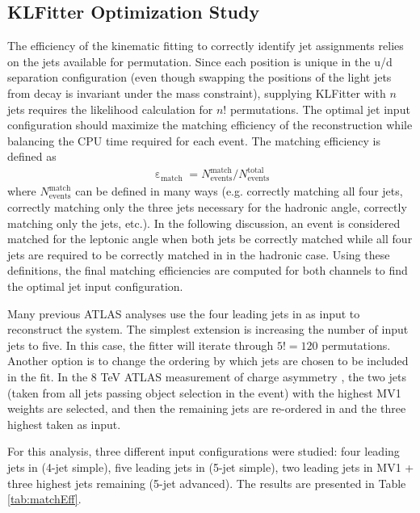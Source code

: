\subsection{KLFitter Optimization Study}
\label{sec:KLopt}
The efficiency of the kinematic fitting to correctly identify jet assignments relies on the jets available for permutation. Since each position is unique in the u/d separation configuration (even though swapping the positions of the light jets from \w decay is invariant under the \w mass constraint), supplying KLFitter with $n$ jets requires the likelihood calculation for $n!$ permutations. The optimal jet input configuration should maximize the matching efficiency of the reconstruction while balancing the CPU time required for each event. %
The matching efficiency is defined as
\begin{eqnarray}
\upepsilon_{\text{match}}=N_{\text{events}}^{\text{match}}/N_{\text{events}}^{\text{total}}
\label{eq:matchEff}
\end{eqnarray}
where $N_{\text{events}}^{\text{match}}$ can be defined in many ways (e.g. correctly matching all four jets, correctly matching only the three jets necessary for the hadronic angle, correctly matching only the \bt jets, etc.). In the following discussion, an event is considered matched for the leptonic angle when both \bt jets be correctly matched while all four jets are required to be correctly matched in in the hadronic case. Using these definitions, the final matching efficiencies are computed for both channels to find the optimal jet input configuration.

Many previous ATLAS \ttbar analyses use the four leading jets in \pt as input to reconstruct the \ttbar system. The simplest extension is increasing the number of input jets to five. In this case, the fitter will iterate through $5!=120$ permutations. Another option is to change the ordering by which jets are chosen to be included in the fit. In the 8 TeV ATLAS measurement of \ttbar charge asymmetry \cite{Juste:1647184}, the two jets (taken from all jets passing object selection in the event) with the highest MV1 weights are selected, and then the remaining jets are re-ordered in \pt and the three highest taken as input. 

For this analysis, three different input configurations were studied: four leading jets in \pt (4-jet simple), five leading jets in \pt (5-jet simple), two leading jets in MV1 + three highest \pt jets remaining (5-jet advanced). The results are presented in Table \ref{tab:matchEff}.

